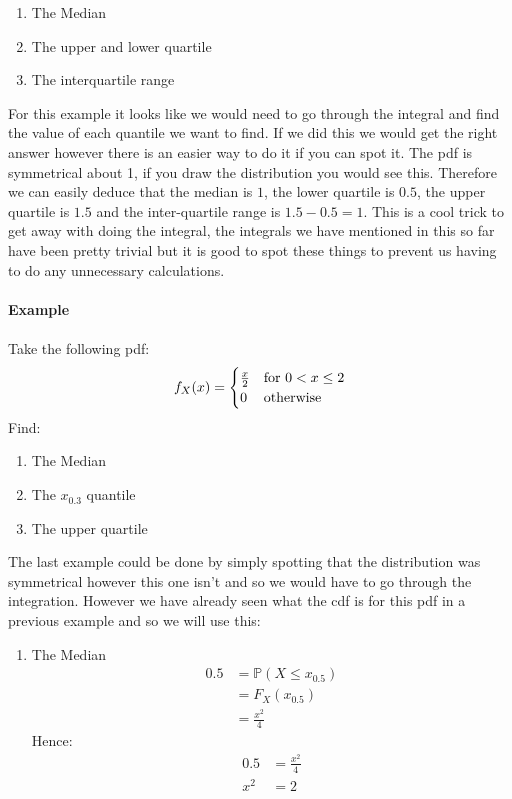 \documentclass[,oneside]{article}
\begin{document}
\begin{enumerate}
\begin{enumerate}
\item The Median
\item The upper and lower quartile
\item The interquartile range 
\end{enumerate}
For this example it looks like we would need to go through the integral and find the value of each quantile we want to find. If we did this we would get the right answer however there is an easier way to do it if you can spot it. The pdf is symmetrical about 1, if you draw the distribution you would see this. Therefore we can easily deduce that the median is $1$, the lower quartile is $0.5$, the upper quartile is $1.5$ and the inter-quartile range is $1.5-0.5=1$. This is a cool trick to get away with doing the integral, the integrals we have mentioned in this so far have been pretty trivial but it is good to spot these things to prevent us having to do any unnecessary calculations. \\ \\
\textbf{Example}\\ \\
Take the following pdf:
\[
f_X(x)=
\begin{cases}
\frac{x}{2} & \text{for } 0 < x \leq 2 \\
0 & $otherwise$
\end{cases} \] 
Find:
\begin{enumerate}
\item The Median
\item The $x_{0.3}$ quantile 
\item The upper quartile
\end{enumerate}
The last example could be done by simply spotting that the distribution was symmetrical however this one isn't and so we would have to go through the integration. However we have already seen what the cdf is for this pdf in a previous example and so we will use this:\\ 
\begin{enumerate}
\item The Median
\begin{align*}
0.5 &= \mathbb{P}(X \leq x_{0.5})\\
&= F_X(x_{0.5})\\
&= \frac{x^2}{4}
\end{align*}
Hence:
\begin{align*}
0.5 &= \frac{x^2}{4}\\
x^2 &= 2\\

\end{align*}
\end{enumerate}
\end{enumerate}
\end{document}

